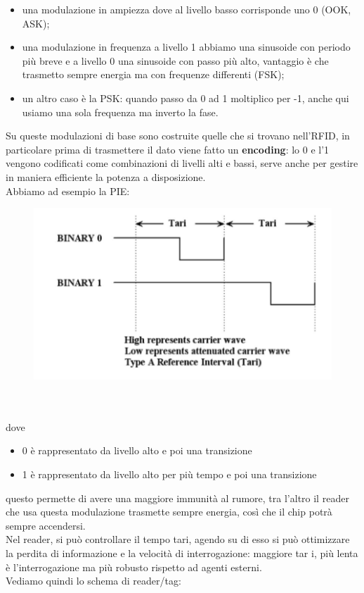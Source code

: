 \documentclass[oneside, 12pt]{extbook}
\begin{document}
\begin{itemize}
	\item una modulazione in ampiezza dove al livello basso corrisponde uno 0 (OOK, ASK);
	\item una modulazione in frequenza a livello 1 abbiamo una sinusoide con periodo più breve e a livello 0 una sinusoide con passo più alto, vantaggio è che trasmetto sempre energia ma con frequenze differenti (FSK);
	\item un altro caso è la PSK: quando passo da 0 ad 1 moltiplico per -1, anche qui usiamo una sola frequenza ma inverto la fase.
\end{itemize}
Su queste modulazioni di base sono costruite quelle che si trovano nell'RFID, in particolare prima di trasmettere il dato viene fatto un \textbf{encoding}: lo 0 e l'1 vengono codificati come combinazioni di livelli alti e bassi, serve anche per gestire in maniera efficiente la potenza a disposizione.\\Abbiamo ad esempio la PIE:\\
\begin{figure}[!h]
	\includegraphics[scale=0.3]{immagini/pie.png}
\end{figure}
\\\\dove 
\begin{itemize}
	\item 0 è rappresentato da livello alto e poi una transizione
	\item 1 è rappresentato da livello alto per più tempo e poi una transizione
\end{itemize}
questo permette di avere una maggiore immunità al rumore, tra l'altro il reader che usa questa modulazione trasmette sempre energia, così che il chip potrà sempre accendersi.\\Nel reader, si può controllare il tempo tari, agendo su di esso si può ottimizzare la perdita di informazione e la velocità di interrogazione: maggiore tar i, più lenta è l'interrogazione ma più robusto rispetto ad agenti esterni.\\Vediamo quindi lo schema di reader/tag:
\end{document}
